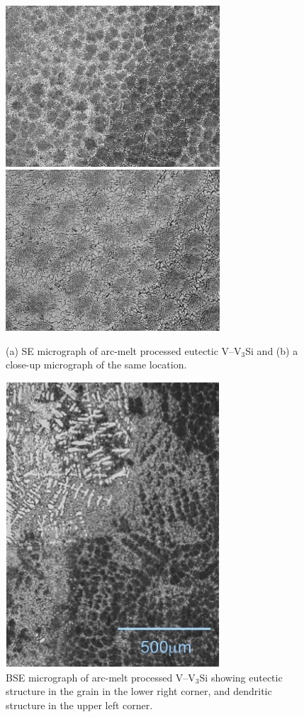 %
\begin{figure}[htbp]
\begin{center}
\includegraphics[width=8cm]{varca}
\includegraphics[width=8cm]{varcb}
\caption{(a) SE micrograph of arc-melt processed eutectic V--V$_3$Si and (b) a close-up micrograph of the same location.}
\label{fig:Vpointsbase}
\end{center}
\end{figure}
%
%

\begin{figure}[htbp]
\begin{center}
\includegraphics[width=8cm]{varcinhomo}
\caption{BSE micrograph of arc-melt processed V--V$_3$Si showing eutectic structure in the grain in the lower right corner, and dendritic structure in the upper left corner.}
\label{fig:varcinhomo}
\end{center}
\end{figure}
%
%

